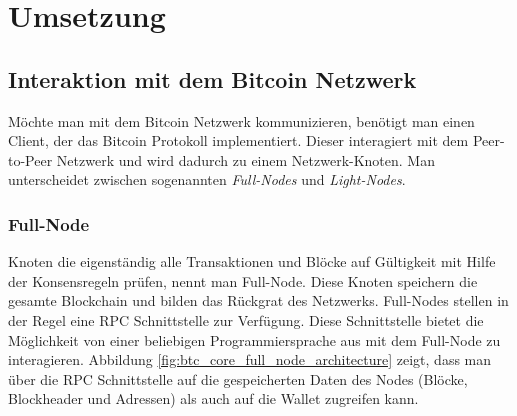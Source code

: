 \section{Umsetzung}

\subsection{Interaktion mit dem Bitcoin Netzwerk}

Möchte man mit dem Bitcoin Netzwerk kommunizieren, benötigt man einen Client, der das Bitcoin Protokoll implementiert. Dieser interagiert mit dem Peer-to-Peer Netzwerk und wird dadurch zu einem Netzwerk-Knoten. Man unterscheidet zwischen sogenannten \textit{Full-Nodes} und \textit{Light-Nodes}.
\subsubsection{Full-Node}
Knoten die eigenständig alle Transaktionen und Blöcke auf Gültigkeit mit Hilfe der Konsensregeln prüfen, nennt man Full-Node. Diese Knoten speichern die gesamte Blockchain und bilden das Rückgrat des Netzwerks.
Full-Nodes stellen in der Regel eine RPC Schnittstelle zur Verfügung. Diese Schnittstelle bietet die Möglichkeit von einer beliebigen Programmiersprache aus mit dem Full-Node zu interagieren.
Abbildung \ref{fig:btc_core_full_node_architecture} zeigt, dass man über die RPC Schnittstelle auf die gespeicherten Daten des Nodes (Blöcke, Blockheader und Adressen) als auch auf die Wallet zugreifen kann.

